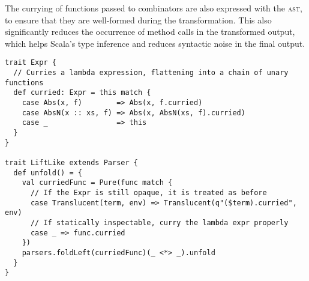 \documentclass[../../main.tex]{subfiles}
\begin{document}
The currying of functions passed to  combinators are also expressed with the  \textsc{ast}, to ensure that they are well-formed during the transformation.
This also significantly reduces the occurrence of  method calls in the transformed output, which helps Scala's type inference and reduces syntactic noise in the final output.
\begin{verbatim}
trait Expr {
  // Curries a lambda expression, flattening into a chain of unary functions
  def curried: Expr = this match {
    case Abs(x, f)        => Abs(x, f.curried)
    case AbsN(x :: xs, f) => Abs(x, AbsN(xs, f).curried)
    case _                => this
  }
}

trait LiftLike extends Parser {
  def unfold() = {
    val curriedFunc = Pure(func match {
      // If the Expr is still opaque, it is treated as before
      case Translucent(term, env) => Translucent(q"($term).curried", env)
      // If statically inspectable, curry the lambda expr properly
      case _ => func.curried
    })
    parsers.foldLeft(curriedFunc)(_ <*> _).unfold
  }
}
\end{verbatim}

\end{document}
